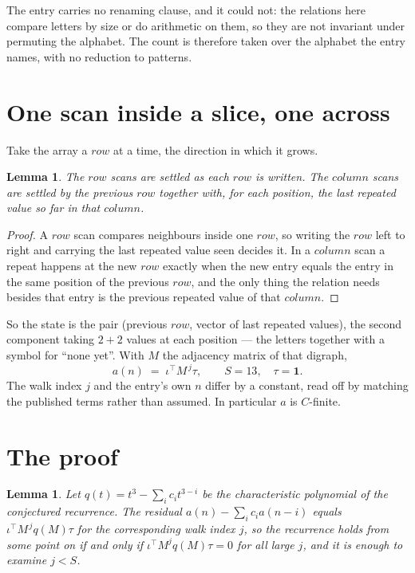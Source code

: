 \documentclass[11pt,a4paper]{article}
\theoremstyle{plain}
\newtheorem{lemma}[theorem]{Lemma}
\theoremstyle{definition}
\begin{document}
The entry carries no renaming clause, and it could not: the relations here compare letters by
size or do arithmetic on them, so they are not invariant under permuting the alphabet. The
count is therefore taken over the alphabet the entry names, with no reduction to patterns.

\section{One scan inside a slice, one across}

Take the array a $row$ at a time, the direction in which it grows.

\begin{lemma}\label{lem:state}
The $row$ scans are settled as each $row$ is written. The $column$ scans are
settled by the previous $row$ together with, for each position, the last repeated value
so far in that $column$.
\end{lemma}

\begin{proof}
A $row$ scan compares neighbours inside one $row$, so writing the
$row$ left to right and carrying the last repeated value seen decides it. In a
$column$ scan a repeat happens at the new $row$ exactly when the new entry equals the
entry in the same position of the previous $row$, and the only thing the relation needs
besides that entry is the previous repeated value of that $column$.
\end{proof}

So the state is the pair (previous $row$, vector of last repeated values), the second
component taking $2+2$ values at each position --- the letters together with a symbol for
``none yet''. With $M$ the adjacency matrix of that digraph,
\[
a(n)\;=\;\iota^{\!\top}M^{\,j}\tau ,\qquad S=13,\quad\tau=\mathbf{1} .
\]
The walk index $j$ and the entry's own $n$ differ by a constant, read off by matching the
published terms rather than assumed. In particular $a$ is $C$-finite.

\section{The proof}

\begin{lemma}\label{lem:crit}
Let $q(t)=t^{3}-\sum_i c_it^{3-i}$ be the characteristic polynomial of the
conjectured recurrence. The residual $a(n)-\sum_ic_ia(n-i)$ equals
$\iota^{\!\top}M^{\,j}q(M)\tau$ for the corresponding walk index $j$, so the recurrence
holds from some point on if and only if $\iota^{\!\top}M^{j}q(M)\tau=0$ for all large $j$,
and it is enough to examine $j<S$.
\end{lemma}
\end{document}

